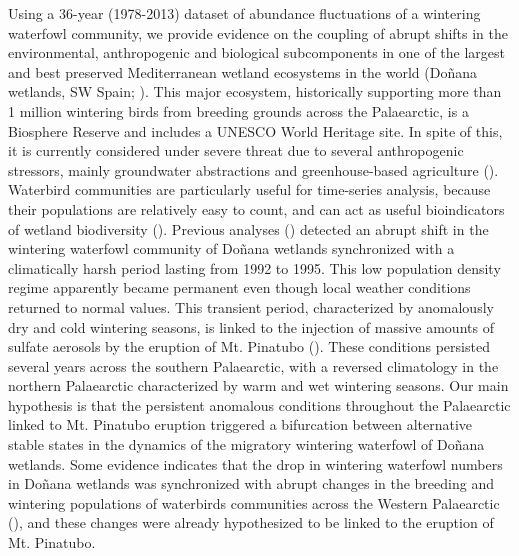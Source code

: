 \documentclass[12pt]{article}
\begin{document}
Using a 36-year (1978-2013) dataset of abundance fluctuations of a wintering waterfowl community, we provide evidence on the coupling of abrupt shifts in the environmental, anthropogenic and biological subcomponents in one of the largest and best preserved Mediterranean wetland ecosystems in the world (Doñana wetlands, SW Spain; \cite{Rendon2008,Almaraz2012,Green2018}). This major ecosystem, historically supporting more than 1 million wintering birds from breeding grounds across the Palaearctic, is a Biosphere Reserve and includes a UNESCO World Heritage site. In spite of this, it is currently considered under severe threat due to several anthropogenic stressors, mainly groundwater abstractions and greenhouse-based agriculture (\cite{Scheffer2015a,Green2017a,Green2018,Camacho2022,Santamaria2023,DeFelipe2023a}). Waterbird communities are particularly useful for time-series analysis, because their populations are relatively easy to count, and can act as useful bioindicators of wetland biodiversity (\cite{Green2014}). Previous analyses (\cite{Almaraz2012}) detected an abrupt shift in the wintering waterfowl community of Doñana wetlands synchronized with a climatically harsh period lasting from 1992 to 1995. This low population density regime apparently became permanent even though local weather conditions returned to normal values. This transient period, characterized by anomalously dry and cold wintering seasons, is linked to the injection of massive amounts of sulfate aerosols by the eruption of Mt. Pinatubo (\cite{Robock2002,Soden2002,Booth2012}). These conditions persisted several years across the southern Palaearctic, with a reversed climatology in the northern Palaearctic characterized by warm and wet wintering seasons. Our main hypothesis is that the persistent anomalous conditions throughout the Palaearctic linked to Mt. Pinatubo eruption triggered a bifurcation between alternative stable states in the dynamics of the migratory wintering waterfowl of Doñana wetlands. Some evidence indicates that the drop in wintering waterfowl numbers in Doñana wetlands was synchronized with abrupt changes in the breeding and wintering populations of waterbirds communities across the Western Palaearctic (\cite{Ganter2000,Mitchell2008,Christensen2014}), and these changes were already hypothesized to be linked to the eruption of Mt. Pinatubo. \\
\end{document}
